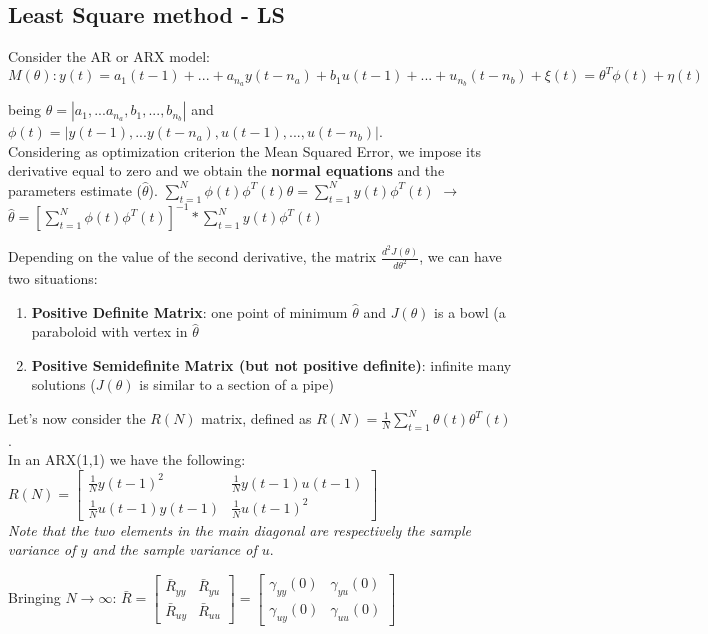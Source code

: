 \documentclass[10pt,a4paper]{article}
\begin{document}
\subsection{Least Square method - LS}
Consider the AR or ARX model:
\center $M(\theta):y(t)=a_1(t-1)+...+a_{n_a}y(t-n_a)+b_1u(t-1)+...+u_{n_b}(t-n_b)+\xi(t)= \theta^T\phi(t)+\eta(t)$
\\ \raggedright \vspace{0.5em}
being $\theta = |a_1, ... a_{n_a}, b_1, ..., b_{n_b}|$ and 
$\phi(t)=|y(t-1), ... y(t-n_a), u(t-1), ..., u(t-n_b)|$. \\
Considering as optimization criterion the Mean Squared Error, we impose its derivative equal to zero and we obtain the \textbf{normal equations} and the parameters estimate ($\hat{\theta}$).
\center
	$\sum_{t=1}^N\phi(t)\phi^T(t)\theta = \sum_{t=1}^Ny(t)\phi^T(t)$ $\rightarrow$ $\hat{\theta}=[\sum_{t=1}^N\phi(t)\phi^T(t)]^{-1}*\sum_{t=1}^Ny(t)\phi^T(t)$ 
\\ \raggedright \vspace{0.5em}
Depending on the value of the second derivative, the matrix $\frac{d^2J(\theta)}{d\theta^2}$, we can have two situations:
\begin{enumerate}
	\item \textbf{Positive Definite Matrix}: one point of minimum $\hat{\theta}$ and $J(\theta)$ is a bowl (a paraboloid with vertex in $\hat{\theta}$
	\item \textbf{Positive Semidefinite Matrix (but not positive definite)}: infinite many solutions ($ J(\theta)$ is similar to a section of a pipe)
\end{enumerate}
Let's now consider the $R(N)$ matrix, defined as $R(N)=\frac{1}{N}\sum_{t=1}^N\theta(t)\theta^T(t)$. \\
In an ARX(1,1) we have the following:
\center
$R(N) = \begin{bmatrix}
\frac{1}{N}y(t-1)^2 & \frac{1}{N}y(t-1)u(t-1)\\
\frac{1}{N}u(t-1)y(t-1) & \frac{1}{N}u(t-1)^2
\end{bmatrix}$ \\ \vspace{0.3em}
\textit{Note that the two elements in the main diagonal are respectively the sample variance of $y$ and the sample variance of $u$}. \\
\raggedright
Bringing $N \rightarrow \infty$:
$\bar{R}= \begin{bmatrix}
\bar{R}_{yy} & \bar{R}_{yu}\\
\bar{R}_{uy} & \bar{R}_{uu}
\end{bmatrix} = \begin{bmatrix}
\gamma_{yy}(0) & \gamma_{yu}(0)\\
\gamma_{uy}(0) & \gamma_{uu}(0)
\end{bmatrix}$ \\ \vspace{0.5em}
\end{document}
